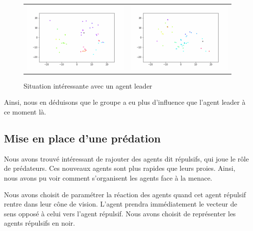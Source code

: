 \documentclass[french, a4paper, 12pt, openany]{report}
\begin{document}
       \begin{figure}[!h]
		\centering
		\begin{tabular}{cc}
			\includegraphics[width=8cm]{images/image_13.png} & \includegraphics[width=8cm]{images/image_14.png} \\
		\end{tabular}
		\caption{Situation intéressante avec un agent leader}
	\end{figure}
       
       Ainsi, nous en déduisons que le groupe a eu plus d'influence que l'agent leader à ce moment là.
       
       
   \subsection{Mise en place d'une prédation}
       
       Nous avons trouvé intéressant de rajouter des agents dit répulsifs, qui joue le rôle de prédateurs. Ces nouveaux agents sont plus rapides que leurs proies. Ainsi, nous avons pu voir comment s'organisent les agents face à la menace.
       
       Nous avons choisit de paramétrer la réaction des agents quand cet agent répulsif rentre dans leur cône de vision. L'agent prendra immédiatement le vecteur de sens opposé à celui vers l'agent répulsif. Nous avons choisit de représenter les agents répulsifs en noir.\\
       
\end{document}
